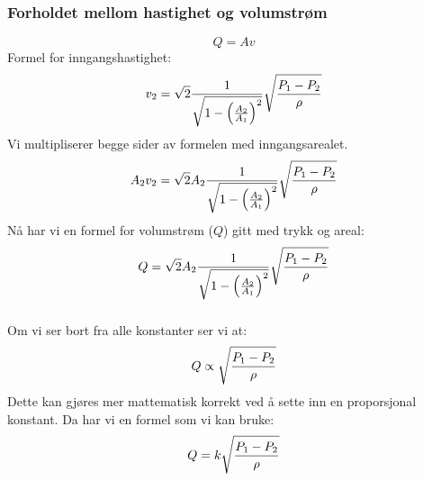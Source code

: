 \documentclass{beamer}
\begin{document}
%
\begin{frame}
	\frametitle{Forholdet mellom hastighet og volumstrøm}

	


%
$$Q = Av$$
%
Formel for inngangshastighet:
%
$$v_2 = \sqrt{2} {1 \over \sqrt{1 - \left({A_2 \over A_1}\right)^2}} \sqrt{{P_1 - P_2} \over \rho}$$
%
Vi multipliserer begge sider av formelen med inngangsarealet. 
%
$$A_2 v_2 = \sqrt{2} A_2 {1 \over \sqrt{1 - \left({A_2 \over A_1}\right)^2}} \sqrt{{P_1 - P_2} \over \rho}$$
%
%
Nå har vi en formel for volumstrøm ($Q$) gitt med trykk og areal:
%
$$Q = \sqrt{2} A_2 {1 \over \sqrt{1 - \left({A_2 \over A_1}\right)^2}} \sqrt{{P_1 - P_2} \over \rho}$$
%
\end{frame}
\begin{frame}
	\frametitle{}

	



%
Om vi ser bort fra alle konstanter ser vi at:
%
$$Q \propto \sqrt{{P_1 - P_2} \over \rho}$$
%
Dette kan gjøres mer mattematisk korrekt ved å sette inn en proporsjonal konstant. Da har vi en formel som vi kan bruke:
%
$$Q = k \sqrt{{P_1 - P_2} \over \rho}$$
%
%
\end{frame}
%
%
%
%
\end{document}

